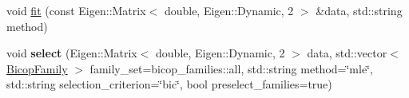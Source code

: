 {\bf }\par
\begin{DoxyCompactItemize}
\item 
void \hyperlink{classvinecopulib_1_1_bicop_a266fa8d13e8ed1e96937e4208a99955d}{fit} (const Eigen\+::\+Matrix$<$ double, Eigen\+::\+Dynamic, 2 $>$ \&data, std\+::string method)
\item 
void {\bfseries select} (Eigen\+::\+Matrix$<$ double, Eigen\+::\+Dynamic, 2 $>$ data, std\+::vector$<$ \hyperlink{family_8hpp_a42e95cc06d33896199caab0c11ad44f3}{Bicop\+Family} $>$ family\+\_\+set=bicop\+\_\+families\+::all, std\+::string method=\char`\"{}mle\char`\"{}, std\+::string selection\+\_\+criterion=\char`\"{}bic\char`\"{}, bool preselect\+\_\+families=true)\hypertarget{classvinecopulib_1_1_bicop_af04ef20ec08d02222059ba2b72084ad0}{}\label{classvinecopulib_1_1_bicop_af04ef20ec08d02222059ba2b72084ad0}

\end{DoxyCompactItemize}

